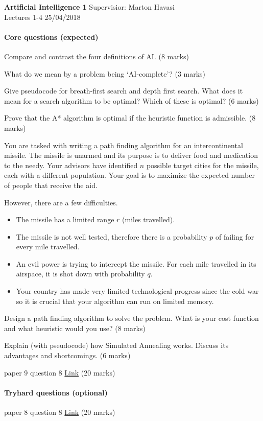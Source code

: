 \documentclass{exam}
\begin{document}
\noindent
\large\textbf{Artificial Intelligence 1} \hfill Supervisior: Marton Havasi \\
\normalsize Lectures 1-4 \hfill 25/04/2018

\paragraph{Core questions (expected)}
\begin{questions}
\question Compare and contrast the four definitions of AI. (8 marks)

\question What do we mean by a problem being `AI-complete'? (3 marks)

\question Give pseudocode for breath-first search and depth first search. What does it mean for a search algorithm to be optimal? Which of these is optimal? (6 marks)

\question Prove that the A* algorithm is optimal if the heuristic function is admissible. (8 marks)

\question You are tasked with writing a path finding algorithm for an intercontinental missile. The missile is unarmed and its purpose is to deliver food and medication to the needy. Your advisors have identified $n$ possible target cities for the missile, each with a different population. Your goal is to maximize the expected number of people that receive the aid.

However, there are a few difficulties.
\begin{itemize}
\item The missile has a limited range $r$ (miles travelled).
\item The missile is not well tested, therefore there is a probability $p$ of failing for every mile travelled.
\item An evil power is trying to intercept the missile. For each mile travelled in its airspace, it is shot down with probability $q$.
\item Your country has made very limited technological progress since the cold war so it is crucial that your algorithm can run on limited memory.
\end{itemize}

Design a path finding algorithm to solve the problem. What is your cost function and what heuristic would you use? (8 marks)

\question Explain (with pseudocode) how Simulated Annealing works. Discuss its advantages and shortcomings. (6 marks)

 paper 9 question 8 \href{https://www.cl.cam.ac.uk/teaching/exams/pastpapers/y2001p9q8.pdf}{Link} (20 marks)

\end{questions}

\paragraph{Tryhard questions (optional)}
\begin{questions}
 paper 8 question 8 \href{https://www.cl.cam.ac.uk/teaching/exams/pastpapers/y2001p8q8.pdf}{Link} (20 marks)

\end{questions}
\end{document}
